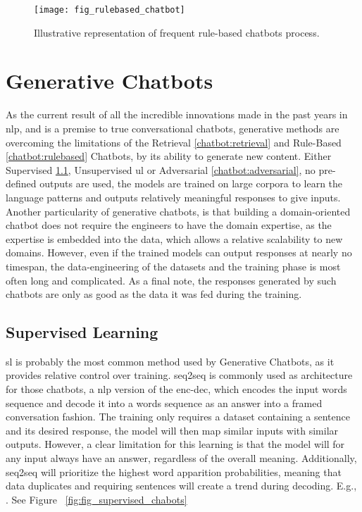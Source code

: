 \begin{figure}[H]
    \centering
    \texttt{[image: fig\_rulebased\_chatbot]}
    \caption{Illustrative representation of frequent rule-based chatbots process.}
    \label{fig:fig_rulebased_chatbot}
\end{figure}

\section{Generative Chatbots}
\label{chatbot:generative}
As the current result of all the incredible innovations made in the past years in \gls{nlp}, and is a premise to true conversational chatbots, generative methods are overcoming the limitations of the Retrieval \ref{chatbot:retrieval} and Rule-Based \ref{chatbot:rulebased} Chatbots, by its ability to generate new content. Either Supervised \ref{chatbot:supervised}, Unsupervised \gls{ul} or Adversarial \ref{chatbot:adversarial}, no pre-defined outputs are used, the models are trained on large corpora to learn the language patterns and outputs relatively meaningful responses to give inputs. Another particularity of generative chatbots, is that building a domain-oriented chatbot does not require the engineers to have the domain expertise, as the expertise is embedded into the data, which allows a relative scalability to new domains. However, even if the trained models can output responses at nearly no timespan, the data-engineering of the datasets and the training phase is most often long and complicated. As a final note, the responses generated by such chatbots are only as good as the data it was fed during the training.

\subsection{Supervised Learning}
\label{chatbot:supervised}
\gls{sl} is probably the most common method used by Generative Chatbots, as it provides relative control over training. \gls{seq2seq} is commonly used as architecture for those chatbots, a \gls{nlp} version of the \gls{enc-dec}, which encodes the input words sequence and decode it into a words sequence as an answer into a framed conversation fashion. The training only requires a dataset containing a sentence and its desired response, the model will then map similar inputs with similar outputs. However, a clear limitation for this learning is that the model will for any input always have an answer, regardless of the overall meaning. Additionally, \gls{seq2seq} will prioritize the highest word apparition probabilities, meaning that data duplicates and requiring sentences will create a trend during decoding. E.g., . See Figure ~\ref{fig:fig_supervised_chabots} 

